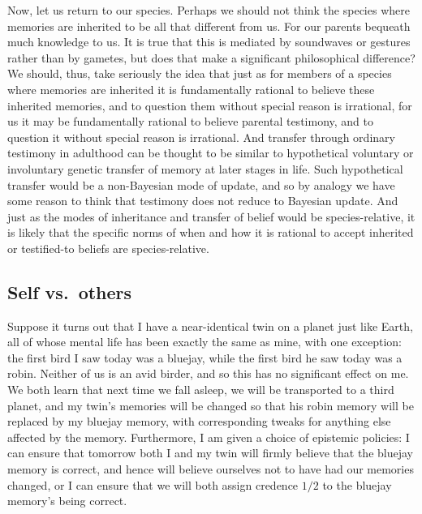 Now, let us return to our species. Perhaps we should not think the species where memories are inherited to be all that
different from us. For our parents bequeath much knowledge to us. It is true that this is mediated by soundwaves or gestures rather than by gametes, but does that make a significant philosophical difference? We should, thus, take seriously the idea
that just as for members of a species where memories are inherited it is fundamentally rational to believe these inherited
memories, and to question them without special reason is irrational, for us it may be fundamentally rational to believe
parental testimony, and to question it without special reason is irrational. And transfer through ordinary 
testimony in adulthood can be thought to be similar to hypothetical voluntary or involuntary genetic transfer of
memory at later stages in life. Such hypothetical transfer would be a non-Bayesian mode of update, and so by analogy we have some reason to think
that testimony does not reduce to Bayesian update. And just as the modes of inheritance and transfer
of belief would be species-relative, it is likely that the specific norms of when and how it is rational to accept inherited 
or testified-to beliefs are species-relative. 

\subsection{Self vs.\ others}
Suppose it turns out that I have a near-identical twin on a planet just like Earth, all of whose mental life has been exactly 
the same as mine, with one exception: the first bird I saw today was a bluejay, while the first bird he saw today was a robin. 
Neither of us is an avid birder, and so this has no significant effect on me. We both learn that next time we fall asleep, we 
will be transported to a third planet, and my twin's memories will be changed so that his robin memory will be replaced by my
bluejay memory, with corresponding tweaks for anything else affected by the memory. Furthermore, I am given a choice of epistemic
policies: I can ensure that tomorrow both I and my twin will firmly believe that the bluejay memory is correct, and hence will 
believe ourselves not to have had our memories changed, or I can ensure that we will both assign credence $1/2$ to the bluejay 
memory's being correct. 

